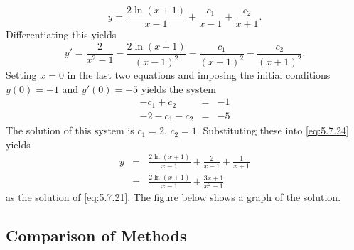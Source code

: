\documentclass{ximera}
\begin{document}
\begin{example}
\begin{explanation}
\begin{equation}
y=\frac{2\ln(x+1)}{x-1}+\frac{c_1}{x-1}+\frac{c_2}{x+1}.
\end{equation}
Differentiating this yields
$$
y'=\frac{2}{x^2-1}-\frac{2\ln(x+1)}{(x-1)^2}-\frac{c_1}{(x-1)^2}-\frac{c_2}{(x+1)^2}.
$$
Setting $x=0$ in the last two equations and imposing the initial conditions
$y(0)=-1$ and $y'(0)=-5$ yields the system
\begin{eqnarray*}
-c_1+c_2&=&-1\\
-2-c_1-c_2&=&-5
\end{eqnarray*}
The solution of this system is $c_1=2,\,c_2=1$.  Substituting
these into
\eqref{eq:5.7.24} yields
\begin{eqnarray*}
y&=&\frac{2\ln(x+1)}{x-1}+\frac{2}{x-1}+\frac{1}{x+1}\\
&=&\frac{2\ln(x+1)}{x-1}+\frac{3x+1}{x^2-1}
\end{eqnarray*}
as the solution of  \eqref{eq:5.7.21}. The figure below shows a graph of the solution.

\begin{center}
\end{center}
 
\end{explanation}
\end{example}
 
\subsection*{Comparison of Methods}
 
\end{document}
